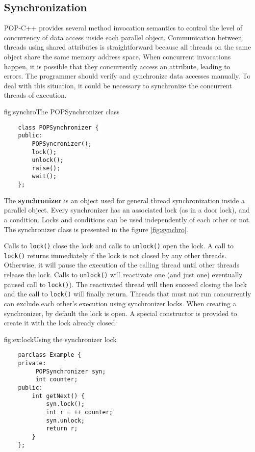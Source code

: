 \subsection{Synchronization}

POP-C++ provides several method invocation semantics to control the
level of concurrency of data access inside each parallel object. 
Communication between threads using shared attributes is straightforward
because all threads on the same object share the same memory address
space. When concurrent invocations happen, it is possible that they
concurrently access an attribute, leading to errors. The programmer
should verify and synchronize data accesses manually. To deal with this
situation, it could be necessary to synchronize the concurrent threads of
execution.

\begin{figura}{fig:synchro}{The POPSynchronizer class}%
\vspace{-4mm}%
\begin{verbatim}
    class POPSynchronizer {
    public:
        POPSyncronizer();
        lock();
        unlock();
        raise();
        wait();
    };
\end{verbatim}
\end{figura}

The \textbf{synchronizer} is an object used for general thread
synchronization inside a parallel object. Every synchronizer has an
associated lock (as in a door lock), and a condition. Locks and
conditions can be used independently of each other or not. The
synchronizer class is presented in the figure \ref{fig:synchro}.

Calls to \texttt{lock()} close the lock and calls to \texttt{unlock()}
open the lock. A call to \texttt{lock()} returns immediately if the lock
is not closed by any other threads. Otherwise, it will pause the execution
of the calling thread until other threads release the lock. Calls to
\texttt{unlock()} will reactivate one (and just one) eventually paused
call to \texttt{lock()}). The reactivated thread will then succeed
closing the lock and the call to \texttt{lock()} will finally return.
Threads that must not run concurrently can exclude each other's
execution using synchronizer locks. When creating a synchronizer, by
default the lock is open. A special constructor is provided to create it
with the lock already closed.

\begin{figura}{fig:ex:lock}{Using the synchronizer lock}%
\vspace{-4mm}%
\begin{verbatim}
    parclass Example {
    private:
         POPSynchronizer syn;
         int counter;
    public:
        int getNext() {
            syn.lock();
            int r = ++ counter;
            syn.unlock;
            return r;
        }
    };
\end{verbatim}
\end{figura}

